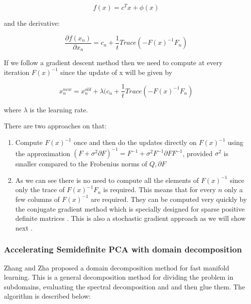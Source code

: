 \documentclass[12pt,letterpaper,doublespaced,ETD,dvips,proposal]{gtthesis}
\begin{document}
\begin{Body}
\begin{equation}
f(x)=c^Tx+\phi(x)
\end{equation}

and the derivative:

\begin{equation}
\frac{\partial f(x_n)}{\partial x_{n}} = c_n
+\frac{1}{t}Trace(-F(x)^{-1}F_n)
\end{equation}

If we follow a gradient descent method then we need to compute at
every iteration $F(x)^{-1}$ since the update of x will be given by

\begin{equation}
x_{n}^{new}=x_{n}^{old}+\lambda (c_n
+\frac{1}{t}Trace(-F(x)^{-1}F_n)
\end{equation}

where $\lambda$ is the learning rate.

There are two approaches on that:
\begin{enumerate}
  \item Compute $F(x)^{-1}$ once and then do the updates directly on
  $F(x)^{-1}$ using the approximation $(F+ \sigma^2\partial F)^{-1}
  = F^{-1} + \sigma^2 F^{-1}\partial F F^{-1}$, provided $\sigma^2$
  is smaller compared to the Frobenius norms of $Q, \partial F$
  \item As we can see there is no need to compute all the elements
  of $F(x)^{-1}$ since only the trace of $F(x)^{-1}F_n$ is required.
  This means that for every $n$ only a few columns of $F(x)^{-1}$
  are required. They can be computed very quickly by the conjugate
  gradient method which is specially designed for sparse positive
  definite matrices \cite{saad2003ims}. This is also a stochastic gradient approach as
  we will show next \cite{spall2003iss}.
\end{enumerate}

\subsubsection{Accelerating Semidefinite PCA with domain
decomposition}

Zhang and Zha  \cite{zhang:ddm} proposed a domain decomposition method for fast
manifold learning. This is a general decomposition method for
dividing the problem in subdomains, evaluating the spectral
decomposition and and then glue them. The algorithm is described
below:

\vspace{1cm}


\end{Body}
\end{document}
